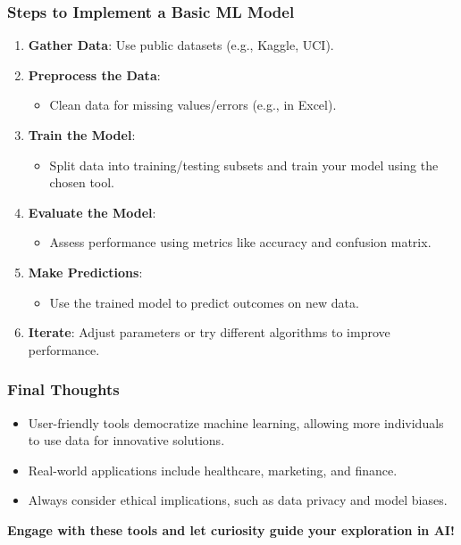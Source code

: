\documentclass[aspectratio=169]{beamer}
\begin{document}
\begin{frame}[fragile]
    \frametitle{Steps to Implement a Basic ML Model}
    \begin{enumerate}
        \item \textbf{Gather Data}: Use public datasets (e.g., Kaggle, UCI).
        \item \textbf{Preprocess the Data}:
        \begin{itemize}
            \item Clean data for missing values/errors (e.g., in Excel).
        \end{itemize}
        \item \textbf{Train the Model}: 
        \begin{itemize}
            \item Split data into training/testing subsets and train your model using the chosen tool.
        \end{itemize}
        \item \textbf{Evaluate the Model}:
        \begin{itemize}
            \item Assess performance using metrics like accuracy and confusion matrix.
        \end{itemize}
        \item \textbf{Make Predictions}:
        \begin{itemize}
            \item Use the trained model to predict outcomes on new data.
        \end{itemize}
        \item \textbf{Iterate}: Adjust parameters or try different algorithms to improve performance.
    \end{enumerate}
\end{frame}

\begin{frame}[fragile]
    \frametitle{Final Thoughts}
    \begin{itemize}
        \item User-friendly tools democratize machine learning, allowing more individuals to use data for innovative solutions.
        \item Real-world applications include healthcare, marketing, and finance.
        \item Always consider ethical implications, such as data privacy and model biases.
    \end{itemize}
    \newline
    \textbf{Engage with these tools and let curiosity guide your exploration in AI!}
\end{frame}
\end{document}
